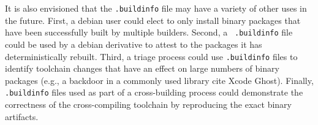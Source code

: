 \begin{itemize}
It is also envisioned that the {\tt .buildinfo} file may have a variety of
other uses in the future.  First, a debian user could elect to only install 
binary packages that have been successfully built by multiple builders.
   Second, a {\tt
.buildinfo} file could be used by a debian derivative to attest to the 
packages it has deterministically rebuilt.  Third, a triage process could
use {\tt .buildinfo} files to identify toolchain changes that have an effect on
large numbers of binary packages (e.g., a backdoor in a commonly used
library cite Xcode Ghost).  Finally, {\tt .buildinfo} files used as part 
of a cross-building process could demonstrate the correctness of the
cross-compiling toolchain by reproducing the exact binary artifacts.

\end{itemize}
